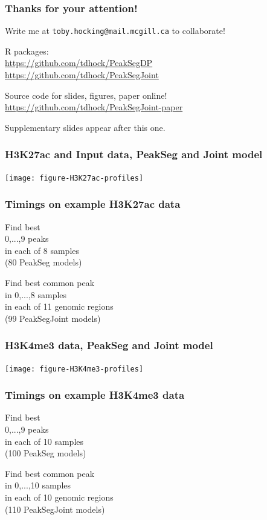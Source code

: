 \documentclass{beamer}
\begin{document}
\begin{frame}
  \frametitle{Thanks for your attention!}
  Write me at \alert{\texttt{toby.hocking@mail.mcgill.ca}} to collaborate!

  \vskip 1cm

  R packages:\\
  \url{https://github.com/tdhock/PeakSegDP}\\
  \url{https://github.com/tdhock/PeakSegJoint}

  \vskip 1cm

  Source code for slides, figures, paper online!\\
  \small
  \url{https://github.com/tdhock/PeakSegJoint-paper}
  \vskip 1cm

  Supplementary slides appear after this one.

\end{frame}

\begin{frame}
  \frametitle{H3K27ac and Input data, PeakSeg and Joint model}

  \texttt{[image: figure-H3K27ac-profiles]}
\end{frame}

\begin{frame}
  \frametitle{Timings on example H3K27ac data}

  \scriptsize

  \parbox{2in}{
    Find best \\
  0,...,9 peaks\\
  in each of 8 samples\\
  (80 PeakSeg models)

  
  }
  \parbox{2in}{
  Find best common peak\\
  in 0,...,8 samples\\
  in each of 11 genomic regions\\
  (99 PeakSegJoint models)

  
  }

\end{frame}

\begin{frame}
  \frametitle{H3K4me3 data, PeakSeg and Joint model}

  \texttt{[image: figure-H3K4me3-profiles]}
\end{frame}

\begin{frame}
  \frametitle{Timings on example H3K4me3 data}

  \small

\parbox{1.5in}{
  Find best \\
  0,...,9 peaks\\
  in each of 10 samples\\
  (100 PeakSeg models)

  
}
\parbox{2in}{
  Find best common peak\\
  in 0,...,10 samples\\
  in each of 10 genomic regions\\
  (110 PeakSegJoint models)

  
}

\end{frame}
\end{document}
